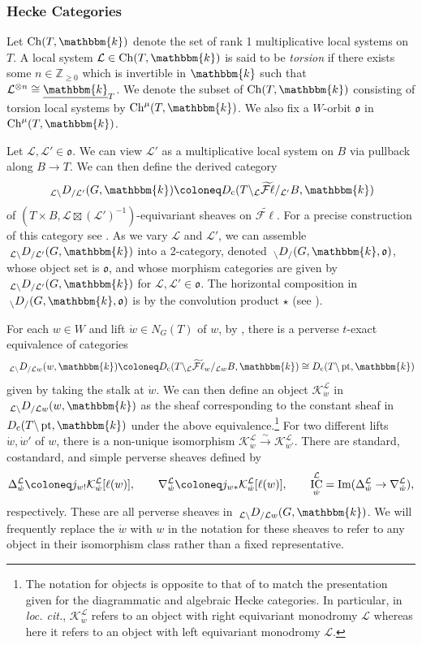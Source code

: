 \documentclass{amsart}
\newcommand{\Z}{\mathbb{Z}}
\renewcommand{\k}{\mathbbm{k}}
\newcommand{\scrK}{\mathcal{K}}
\newcommand{\scrL}{\mathcal{L}}
\DeclareMathOperator{\cons}{c}
\DeclareMathOperator{\Ch}{Ch}
\DeclareMathOperator{\IC}{IC}
\newcommand{\uk}{\underline{\k}}
\DeclareMathOperator{\pt}{pt}
\newcommand{\fr}[1]{\mathfrak{#1}}
\newcommand{\eFl}{\widetilde{\mathcal{F}\ell}}
\newcommand{\DEE}[2]{\:_{#1 \backslash} D_{/ #2} }
\theoremstyle{definition}
\numberwithin{equation}{subsection}
\begin{document}
\subsubsection{Hecke Categories}

Let $\Ch (T, \k)$ denote the set of rank 1 multiplicative local systems on $T$.
A local system $\scrL \in \Ch (T, \k)$ is said to be \emph{torsion} if there exists some $n \in \Z_{\geq 0}$ which is invertible in $\k$ such that $\scrL^{\otimes n} \cong \uk_T$.
We denote the subset of $\Ch (T, \k)$ consisting of torsion local systems by $\Ch^{\mu} (T, \k)$.
We also fix a $W$-orbit $\fr{o}$ in $\Ch^{\mu} (T, \k)$.

Let $\scrL, \scrL' \in \fr{o}$. We can view $\scrL'$ as a multiplicative local system on $B$ via pullback along $B \to T$. 
We can then define the derived category
\[\DEE{\scrL}{\scrL'} (G, \k) \coloneq D_{\cons} (T \backslash_{\scrL} \eFl /_{\scrL'} B, \k)\]
of $(T \times B, \scrL \boxtimes (\scrL')^{-1})$-equivariant sheaves on $\eFl$. For a precise construction of this category see \cite{Sandvik}.
As we vary $\scrL$ and $\scrL'$, we can assemble $\DEE{\scrL}{\scrL'} (G, \k)$ into a 2-category, denoted $\DEE{}{} (G, \k, \fr{o})$, whose object set is $\fr{o}$, and whose morphism categories are given by $\DEE{\scrL}{\scrL'} (G, \k)$ for $\scrL, \scrL' \in \fr{o}$.
The horizontal composition in $\DEE{}{} (G, \k, \fr{o})$ is by the convolution product $\star$ (see \cite[\S3.3]{Sandvik}).

For each $w \in W$ and lift $\dot{w} \in N_G (T)$ of $w$, by \cite[Proposition 3.2.2]{Sandvik}, there is a perverse $t$-exact equivalence of categories
\[\DEE{\scrL}{\scrL w} (w, \k) \coloneq D_{\cons} (T \backslash_{\scrL} \eFl_w /_{\scrL w} B, \k) \cong D_{\cons} (T \backslash \pt, \k)\]
given by taking the stalk at $\dot{w}$.
We can then define an object $\scrK_{\dot{w}}^{\scrL}$ in $\DEE{\scrL}{\scrL w} (w, \k)$ as the sheaf corresponding to the constant sheaf in $D_{\cons} (T \backslash \pt, \k)$ under the above equivalence.\footnote{The notation for objects is opposite to that of \cite{Sandvik} to match the presentation given for the diagrammatic and algebraic Hecke categories. In particular, in \emph{loc. cit.}, $\scrK_{\dot{w}}^{\scrL}$ refers to an object with right equivariant monodromy $\scrL$ whereas here it refers to an object with left equivariant monodromy $\scrL$.}
For two different lifts $\dot{w}, \dot{w}'$ of $w$, there is a non-unique isomorphism $\scrK_{\dot{w}}^{\scrL} \stackrel{\sim}{\to} \scrK_{\dot{w}'}^{\scrL}$. 
There are standard, costandard, and simple perverse sheaves defined by
\[\Delta_{\dot{w}}^{\scrL} \coloneq j_{w!} \scrK_{\dot{w}}^{\scrL} [\ell(w)], \qquad \nabla_{\dot{w}}^{\scrL} \coloneq j_{w*} \scrK_{\dot{w}}^{\scrL} [\ell(w)], \qquad \IC_{\dot{w}}^{\scrL} = \textnormal{Im} (\Delta_{\dot{w}}^{\scrL} \to \nabla_{\dot{w}}^{\scrL}),\]
respectively. These are all perverse sheaves in $\DEE{\scrL}{\scrL w} (G, \k)$. We will frequently replace the $\dot{w}$ with $w$ in the notation for these sheaves to refer to any object in their isomorphism class rather than a fixed representative.
\end{document}
